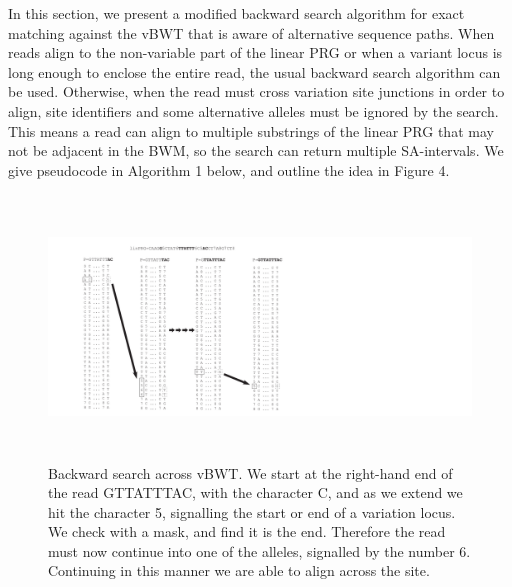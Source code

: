 \documentclass[runningheads,a4paper]{llncs}
\begin{document}
In this section, we present a modified backward search algorithm for exact matching against the vBWT that is aware of alternative sequence paths. When reads align to the non-variable part of the linear PRG or when a variant locus is long enough to enclose the entire read, the usual backward search algorithm can be used. Otherwise, when the read must cross variation site junctions in order to align, site identifiers and some alternative alleles must be ignored by the search. This means a read can align to multiple substrings of the linear PRG that may not be adjacent in the BWM, so the search can return multiple SA-intervals. We give pseudocode in Algorithm 1 below, and outline the idea in Figure 4.




\begin{figure}
\centering
\includegraphics[height=7cm]{BWT.pdf}
\caption{Backward search across vBWT.  We start at the right-hand end of the read GTTATTTAC, with the character C, and as we extend we hit the character 5, signalling the start or end of a variation locus. We check with a mask, and find it is the end. Therefore the read must now continue into one of the alleles, signalled by the number 6. Continuing in this manner we are able to align across the site.}
\label{fig:example}
\end{figure}
\end{document}
